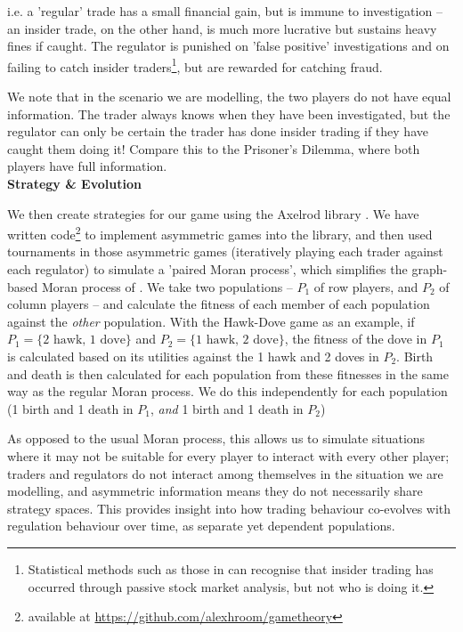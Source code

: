 \documentclass{article}
\begin{document}
i.e. a 'regular' trade has a small financial gain, but is immune to investigation -- an insider trade, on the other hand, is much more lucrative but sustains heavy fines if caught. The regulator is punished on 'false positive' investigations and on failing to catch insider traders\footnote{Statistical methods such as those in \textcite{bris2005insider} can recognise that insider trading has occurred through passive stock market analysis, but not who is doing it.}, but are rewarded for catching fraud. 

We note that in the scenario we are modelling, the two players do not have equal information. The trader always knows when they have been investigated, but the regulator can only be certain the trader has done insider trading if they have caught them doing it! Compare this to the Prisoner's Dilemma, where both players have full information.
\newline\\
\noindent\textbf{Strategy \& Evolution}

We then create strategies for our game using the Axelrod library \parencite{axelrodproject}. We have written code\footnote{available at \href{https://github.com/alexhroom/gametheory}{https://github.com/alexhroom/gametheory}} to implement asymmetric games into the library, and then used tournaments in those asymmetric games (iteratively playing each trader against each regulator) to simulate a 'paired Moran process', which simplifies the graph-based Moran process of \textcite{shakarian2013novel}. We take two populations -- $P_1$ of row players, and $P_2$ of column players -- and calculate the fitness of each member of each population against the \emph{other} population. With the Hawk-Dove game as an example, if $P_1 = \{\text{2 hawk, 1 dove}\}$ and $P_2 = \{\text{1 hawk, 2 dove}\}$, the fitness of the dove in $P_1$ is calculated based on its utilities against the 1 hawk and 2 doves in $P_2$. Birth and death is then calculated for each population from these fitnesses in the same way as the regular Moran process. We do this independently for each population (1 birth and 1 death in $P_1$, \emph{and} 1 birth and 1 death in $P_2$)

As opposed to the usual Moran process, this allows us to simulate situations where it may not be suitable for every player to interact with every other player; traders and regulators do not interact among themselves in the situation we are modelling, and asymmetric information means they do not necessarily share strategy spaces. This provides insight into how trading behaviour co-evolves with regulation behaviour over time, as separate yet dependent populations.
\end{document}
